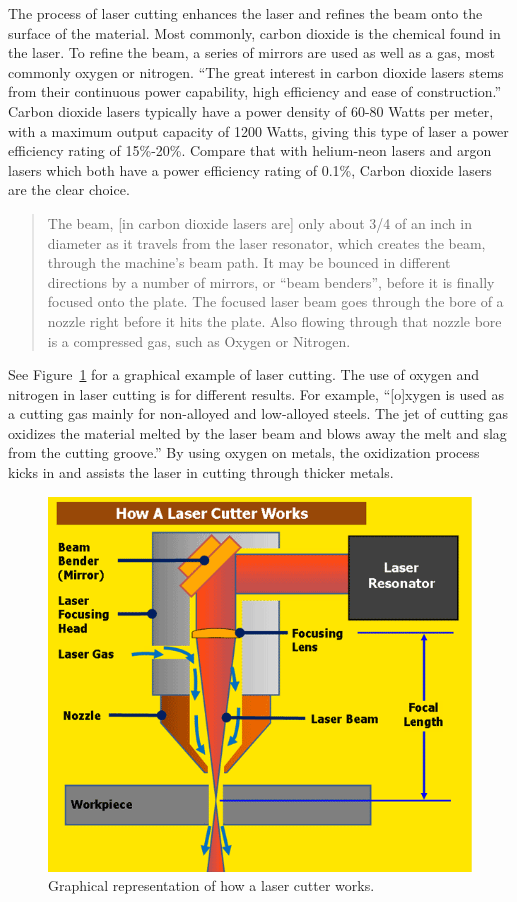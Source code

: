 \documentclass[12pt singlecol]{article}
\begin{document}
\begin{flushleft}
The process of laser cutting enhances the laser and refines the beam onto the surface of the material. Most commonly, carbon dioxide is the chemical found in the laser. To refine the beam, a series of mirrors are used as well as a gas, most commonly oxygen or nitrogen. ``The great interest in carbon dioxide lasers stems from their continuous power capability, high efficiency and ease of construction.'' \cite{WhitehouseND} Carbon dioxide lasers typically have a power density of 60-80 Watts per meter, with a maximum output capacity of 1200 Watts, giving this type of laser a power efficiency rating of 15\%-20\%. Compare that with helium-neon lasers and argon lasers which both have a power efficiency rating of 0.1\%, Carbon dioxide lasers are the clear choice. \cite{WhitehouseND}
\begin{quotation}
The beam, [in carbon dioxide lasers are] only about 3/4 of an inch in diameter as it travels from the laser resonator, which creates the beam, through the machine's beam path. It may be bounced in different directions by a number of mirrors, or ``beam benders'', before it is finally focused onto the plate. The focused laser beam goes through the bore of a nozzle right before it hits the plate. Also flowing through that nozzle bore is a compressed gas, such as Oxygen or Nitrogen. \cite{Zlotnicki13}
\end{quotation}
See Figure~\ref{fig:refract} for a graphical example of laser cutting. The use of oxygen and nitrogen in laser cutting is for different results. For example, ``[o]xygen is used as a cutting gas mainly for non-alloyed and low-alloyed steels. The jet of cutting gas oxidizes the material melted by the laser beam and blows away the melt and slag from the cutting groove.'' \cite{agao212} By using oxygen on metals, the oxidization process kicks in and assists the laser in cutting through thicker metals.

\begin{figure}
	\centering	
	\includegraphics[width=\linewidth]{refract}
	\caption{Graphical representation of how a laser cutter works. \cite{Zlotnicki13}}
	\label{fig:refract}
\end{figure}


\end{flushleft}
\end{document}
